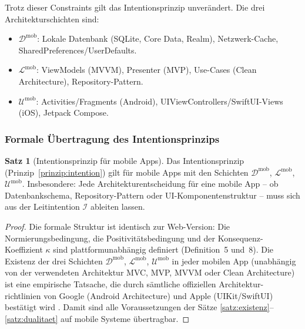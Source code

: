 ﻿\documentclass[a4paper,12pt]{article}
\theoremstyle{definition}
\newtheorem{satz}{Satz}
\begin{document}
Trotz dieser Constraints gilt das Intentionsprinzip unverändert. Die
drei Architekturschichten sind:

\begin{itemize}
    \item $\mathcal{D}^{\text{mob}}$: Lokale Datenbank (SQLite, Core
          Data, Realm), Netzwerk-Cache, SharedPreferences/UserDefaults.
    \item $\mathcal{L}^{\text{mob}}$: ViewModels (MVVM), Presenter (MVP),
          Use-Cases (Clean Architecture), Repository-Pattern.
    \item $\mathcal{U}^{\text{mob}}$: Activities/Fragments (Android),
          UIViewControllers/SwiftUI-Views (iOS), Jetpack Compose.
\end{itemize}

\subsubsection{Formale Übertragung des Intentionsprinzips}

\begin{satz}[Intentionsprinzip für mobile Apps]\label{satz:mobile}
Das Intentionsprinzip (Prinzip~\ref{prinzip:intention}) gilt für mobile
Apps mit den Schichten $\mathcal{D}^{\text{mob}}$,
$\mathcal{L}^{\text{mob}}$, $\mathcal{U}^{\text{mob}}$.
Insbesondere: Jede Architekturentscheidung für eine mobile App --
ob Datenbankschema, Repository-Pattern oder UI-Komponentenstruktur --
muss sich aus der Leitintention $\mathcal{I}$ ableiten lassen.
\end{satz}

\begin{proof}
Die formale Struktur ist identisch zur Web-Version: Die Normierungsbedingung,
die Positivitätsbedingung und der Konsequenz-Koeffizient $\kappa$ sind
plattformunabhängig definiert (Definition~5 und~8). Die Existenz der
drei Schichten $\mathcal{D}^{\text{mob}}$, $\mathcal{L}^{\text{mob}}$,
$\mathcal{U}^{\text{mob}}$ in jeder mobilen App (unabhängig von der
verwendeten Architektur MVC, MVP, MVVM oder Clean Architecture) ist
eine empirische Tatsache, die durch sämtliche offiziellen Architektur-
richtlinien von Google (Android Architecture) und Apple (UIKit/SwiftUI)
bestätigt wird \cite{google2023architecture, apple2023swiftui}.
Damit sind alle Voraussetzungen der Sätze \ref{satz:existenz}--\ref{satz:dualitaet}
auf mobile Systeme übertragbar.
\end{proof}
\end{document}
